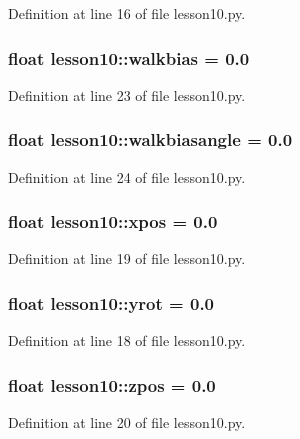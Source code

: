Definition at line 16 of file lesson10.py.
\subsubsection{\setlength{\rightskip}{0pt plus 5cm}float {\bf lesson10::walkbias} = 0.0\hspace{0.3cm}{\tt  [static]}}\label{namespacelesson10_9710fae84bf1a14110fe87eb680806a5}




Definition at line 23 of file lesson10.py.
\subsubsection{\setlength{\rightskip}{0pt plus 5cm}float {\bf lesson10::walkbiasangle} = 0.0\hspace{0.3cm}{\tt  [static]}}\label{namespacelesson10_3fac8ef644d9d325725e16024b89694f}




Definition at line 24 of file lesson10.py.
\subsubsection{\setlength{\rightskip}{0pt plus 5cm}float {\bf lesson10::xpos} = 0.0\hspace{0.3cm}{\tt  [static]}}\label{namespacelesson10_eb2f24802bb91b0192539483499dd46f}




Definition at line 19 of file lesson10.py.
\subsubsection{\setlength{\rightskip}{0pt plus 5cm}float {\bf lesson10::yrot} = 0.0\hspace{0.3cm}{\tt  [static]}}\label{namespacelesson10_869aa9548ef908d062c147efdd6093b0}




Definition at line 18 of file lesson10.py.
\subsubsection{\setlength{\rightskip}{0pt plus 5cm}float {\bf lesson10::zpos} = 0.0\hspace{0.3cm}{\tt  [static]}}\label{namespacelesson10_84fac3a6bae09627eab6ac6b49b575f6}




Definition at line 20 of file lesson10.py.
